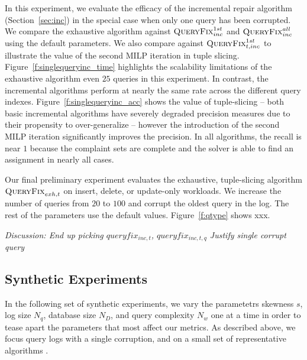 In this experiment, we evaluate the efficacy of the incremental repair algorithm (Section~\ref{sec:inc})
in the special case when only one query has been corrupted.  We compare the exhaustive 
algorithm against $\textsc{QueryFix}_{inc}^{1st}$ and $\textsc{QueryFix}_{inc}^{all}$ using the default parameters.
We also compare against $\textsc{QueryFix}_{t,inc}^{1st}$ to illustrate the value of the second MILP iteration in tuple slicing.
Figure~\ref{f:singlequeryinc_time} highlights the scalability limitations of the exhaustive algorithm 
even $25$ queries in this experiment.  In contrast, the incremental algorithms perform at nearly the same rate
across the different query indexes.  Figure~\ref{f:singlequeryinc_acc} shows the value of tuple-slicing --
both basic incremental algorithms have severely degraded precision measures due to their propensity to over-generalize
-- however the introduction of the second MILP iteration significantly improves the precision.  
In all algorithms, the recall is near $1$ because the complaint sets are complete and the solver is able to find 
an assignment in nearly all cases.


Our final preliminary experiment evaluates the exhaustive, tuple-slicing algorithm 
$\textsc{QueryFix}_{exh,t}$ on insert, delete, or update-only workloads.
We increase the number of queries from $20$ to $100$ and corrupt the oldest query in the log.  
The rest of the parameters use the default values.
Figure~\ref{f:qtype} shows xxx.


{\it Discussion: 
End up picking $queryfix_{inc,t}$, $queryfix_{inc,t,q}$
Justify single corrupt query
}


\subsection{Synthetic Experiments}
In the following set of synthetic experiments, we vary 
the parametetrs skewness $s$, log size $N_q$, database size $N_D$, and
query complexity $N_w$ one at a time in order  to tease apart the parameters that most affect our metrics.
As described above, we focus query logs with a single corruption,
and on a small set of representative algorithms .


